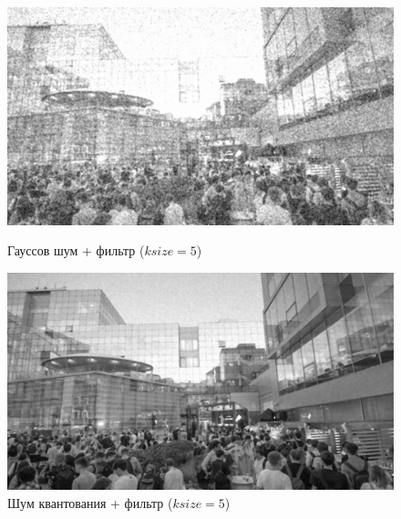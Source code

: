\documentclass[a4paper]{article}
\begin{document}
\begin{figure}[H]
    \begin{minipage}{0.49\textwidth}
        \centering \includegraphics[width=\textwidth]{images/3_nonlinear_filters/gaussian - median (ksize=5).jpg}
        \caption{Гауссов шум + фильтр ($ksize = 5$)}
    \end{minipage}\hfill
    \begin{minipage}{0.49\textwidth}
        \centering \includegraphics[width=\textwidth]{images/3_nonlinear_filters/poisson - median (ksize=5).jpg}
        \caption{Шум квантования + фильтр ($ksize = 5$)}
    \end{minipage}
\end{figure}
\end{document}
